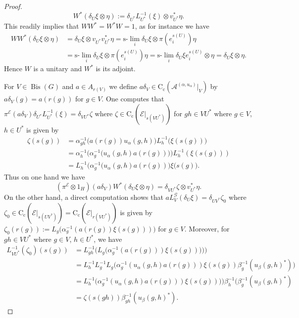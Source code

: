 \documentclass[11 pt, leqno]{amsart}
\numberwithin{equation}{section}
\theoremstyle{plain}
\theoremstyle{definition}
\newcommand*{\contc}{\mathrm{C_c}}%
\DeclareMathOperator{\Bis}{Bis}
\newcommand{\G}{\mathcal G} %
\newcommand{\EE}{\mathcal E}
\newcommand{\A}{\mathcal A}
\begin{document}
\begin{proof}
\[
    W^* (\delta_U \xi \otimes \eta) := \delta_{U^*}L_{U^*}^{-1}(\xi) \otimes v_{U^*}^*\eta.
\]
This readily implies that $WW^* = W^*W = 1$, as for instance we have 
\[
\begin{split}
    WW^* (\delta_U \xi \otimes \eta) &= \delta_{U}\xi\otimes v_{U^*}v_{U^*}^*\eta = \text{s-}\lim_{i}\delta_{U}\xi\otimes \pi(e_i^{s(U)})\eta \\
        &= \text{s-}\lim_{i}\delta_{U}\xi \otimes \pi( e_i^{s(U)}) \eta = \text{s-}\lim_{i}\delta_{U}\xi e_i^{s(U)}\otimes \eta = \delta_U \xi \otimes \eta.
\end{split}
\]
Hence $W$ is a unitary and $W^*$ is its adjoint. 

For $V\in\Bis(G)$ and $a\in A_{r(V)}$ we define $a\delta_V\in \contc(\A^{(\alpha, u_{\alpha})}|_{V})$ by $a\delta_V(g)=a(r(g))$ for $g\in V$.
One computes that $\pi^\EE(a\delta_V)\delta_{U^*}L_{U^*}^{-1}(\xi) = \delta_{VU^*}\zeta$ where $\zeta\in \contc(\EE|_{s(VU^*)})$ for $gh\in VU^*$ where $g\in V$, $h\in U^*$ is given by 
\[
\begin{split}
    \zeta(s(g)) &= \alpha_{gh}^{-1}\Big(a(r(g))u_{\alpha}(g,h)\Big) L_{h}^{-1}\big(\xi(s(g))\big) \\
        &= \alpha_{h}^{-1} \Big( \alpha_g^{-1}\big(u_{\alpha}(g,h) a(r(g))\big) \Big) L_{h}^{-1}(\xi(s(g))) \\
        &= L_{h}^{-1} \Big( \alpha_g^{-1}\big(u_{\alpha}(g,h) a(r(g))\big)\xi(s(g) \Big).
\end{split}
\]
Thus on one hand we have 
\[
    (\pi^{\EE}\otimes 1_{H}) (a\delta_V)  W^*(\delta_U\xi \otimes \eta) = \delta_{VU^*}\zeta \otimes v_{U^*}^*\eta.
\]
On the other hand, a direct computation shows that $aL_{V}^{\G}(\delta_U\xi) = \delta_{UV^*}\zeta_0$ where $\zeta_0\in \contc(\EE|_{s(UV^*)}) = \contc(\EE|_{r(VU^*)})$ is given by $\zeta_0(r(g)) := L_g\Big(\alpha_g^{-1}(a(r(g))\xi (s(g)))\Big)$ for $g\in V$. 
Moreover, for $gh\in VU^*$ where $g\in V$, $h\in U^*$, we have
\[
\begin{split}
    L_{VU^*}^{-1}(\zeta_0)(s(g)) &= L_{gh}^{-1} \Big( L_g\Big(\alpha_g^{-1}(a(r(g)))\xi (s(g)))\Big) \Big) \\
        &= L_{h}^{-1}L_g^{-1} L_g \Big( \alpha_g^{-1} (u_{\alpha}(g,h)a(r(g)))\xi (s(g))\beta_g^{-1}(u_{\beta}(g,h)^*) \Big) \\
        &= L_{h}^{-1} \Big( \alpha_g^{-1}(u_{\alpha}(g,h) a (r(g)))\xi (s(g))) \Big) \beta_{h}^{-1}( \beta_g^{-1}(u_{\beta}(g,h)^*) \\
        &= \zeta(s(gh)) \beta_{gh}^{-1}(u_{\beta}(g,h)^*).%

\end{split}\]
\end{proof}
\end{document}
